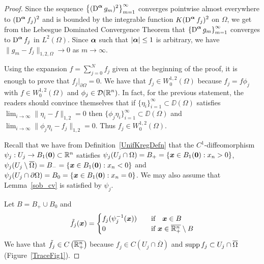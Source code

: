 \begin{proof}
Since the sequence
$\displaystyle \left\{ (\operatorname{D}^{{\bm{\alpha}}} g_m)^2 \right\}_{m=1}^\infty$
converges pointwise almost everywhere to
$\displaystyle (\operatorname{D}^{{\bm{\alpha}}} f_j)^2$
and is bounded by the integrable function
$\displaystyle K (\operatorname{D}^{{\bm{\alpha}}} f_j)^2$ on $\Omega$, we get from
the Lebesgue Dominated Convergence Theorem that
$\displaystyle \left\{ \operatorname{D}^{{\bm{\alpha}}} g_m \right\}_{m=1}^\infty$ converges
to $\displaystyle \operatorname{D}^{{\bm{\alpha}}} f_j$ in $\displaystyle L^2(\Omega)$.
Since ${\bm{\alpha}}$ such that $|{\bm{\alpha}}|\leq 1$ is arbitrary, we have
$\|g_m - f_j\|_{1,2,\Omega} \rightarrow 0$ as $m\rightarrow \infty$.

\stage{$\mathbf{\Rightarrow}$}
Using the expansion
$\displaystyle f = \sum_{j=0}^N f_j$ given at the beginning of the proof, it
is enough to prove that $\displaystyle f_j \big|_{\partial \Omega} = 0$.
We have that 
$\displaystyle f_j \in W^{1,2}_0(\Omega)$ because $f_j = f \phi_j$ with
$\displaystyle f \in W^{1,2}_0(\Omega)$ and
$\displaystyle \phi_j \in \mathcal{D}(\mathbb{R}^n)$.  In fact, for the previous
statement, the readers should convince themselves that if
$\displaystyle \{ \eta_i \}_{i=1}^\infty \subset \DD(\Omega)$
satisfies $\displaystyle \lim_{i\rightarrow \infty} \|\eta_i -f \|_{1,2} = 0$
then
$\displaystyle \{ \phi_j \eta_i \}_{i=1}^\infty \subset \DD(\Omega)$
and
$\displaystyle \lim_{i\rightarrow \infty} \|\phi_j \eta_i -f_j \|_{1,2} = 0$.
Thus $\displaystyle f_j \in W^{1,2}_0(\Omega)$.

Recall that we have from Definition~\ref{UnifKregDefn} that
the $\displaystyle C^1$-diffeomorphism
$\psi_j : U_j \to B_1({\bm{0}}) \subset \mathbb{R}^n$
satisfies $\psi_j(U_j\cap \Omega) = B_+
= \left\{ {\bm{x}}\in B_1({\bm{0}}) : x_n>0 \right\}$,
$\psi_j(U_j \setminus \overline{\Omega}) = B_-
= \left\{ {\bm{x}}\in B_1({\bm{0}}) : x_n<0 \right\}$
and $\psi_j(U_j\cap \partial \Omega) = B_0
= \left\{ {\bm{x}}\in B_1({\bm{0}}) : x_n=0 \right\}$.
We may also assume that Lemma~\ref{sob_cv} is satisfied by $\psi_j$.

Let $B = B_+ \cup B_0$ and
\[
\tilde{f}_j({\bm{x}}) =
\begin{cases}
f_j(\psi_j^{-1}({\bm{x}})) & \quad \text{if} \quad {\bm{x}} \in B \\
0 & \quad \text{if} \ {\bm{x}} \in \overline{\mathbb{R}^n_+} \setminus B
\end{cases}
\]
We have that $\displaystyle \tilde{f}_j \in C\left(\overline{\mathbb{R}^n_+}\right)$
because $\displaystyle f_j \in C\left(U_j\cap \overline{\Omega}\right)$ and
$\operatorname{supp} f_j \subset U_j\cap \overline{\Omega}$ (Figure~\ref{TraceFig1}).


\end{proof}
